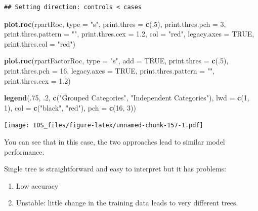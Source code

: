 \documentclass[12pt,]{krantz}
\makeatletter
\newenvironment{Shaded}{\begin{snugshade}}{\end{snugshade}}
\newcommand{\DataTypeTok}[1]{\textcolor[rgb]{0.27,0.27,0.27}{#1}}
\newcommand{\DecValTok}[1]{\textcolor[rgb]{0.06,0.06,0.06}{#1}}
\newcommand{\FloatTok}[1]{\textcolor[rgb]{0.06,0.06,0.06}{#1}}
\newcommand{\KeywordTok}[1]{\textcolor[rgb]{0.27,0.27,0.27}{\textbf{#1}}}
\newcommand{\NormalTok}[1]{#1}
\newcommand{\OtherTok}[1]{\textcolor[rgb]{0.37,0.37,0.37}{#1}}
\newcommand{\StringTok}[1]{\textcolor[rgb]{0.5,0.5,0.5}{#1}}
\providecommand{\tightlist}{%
  \setlength{\itemsep}{0pt}\setlength{\parskip}{0pt}}
\newenvironment{kframe}{%
\medskip{}
\setlength{\fboxsep}{.8em}
 \def\at@end@of@kframe{}%
 \ifinner\ifhmode%
  \def\at@end@of@kframe{\end{minipage}}%
  \begin{minipage}{\columnwidth}%
 \fi\fi%
 \def\FrameCommand##1{\hskip\@totalleftmargin \hskip-\fboxsep
 \colorbox{shadecolor}{##1}\hskip-\fboxsep
     \hskip-\linewidth \hskip-\@totalleftmargin \hskip\columnwidth}%
 \MakeFramed {\advance\hsize-\width
   \@totalleftmargin\z@ \linewidth\hsize
   \@setminipage}}%
 {\par\unskip\endMakeFramed%
 \at@end@of@kframe}
\renewenvironment{Shaded}{\begin{kframe}}{\end{kframe}}
\makeatother
\begin{document}
\begin{verbatim}
## Setting direction: controls < cases
\end{verbatim}

\begin{Shaded}
\begin{Highlighting}[]
\KeywordTok{plot.roc}\NormalTok{(rpartRoc, }
     \DataTypeTok{type =} \StringTok{"s"}\NormalTok{, }
     \DataTypeTok{print.thres =} \KeywordTok{c}\NormalTok{(.}\DecValTok{5}\NormalTok{),}
     \DataTypeTok{print.thres.pch =} \DecValTok{3}\NormalTok{,}
     \DataTypeTok{print.thres.pattern =} \StringTok{""}\NormalTok{,}
     \DataTypeTok{print.thres.cex =} \FloatTok{1.2}\NormalTok{,}
     \DataTypeTok{col =} \StringTok{"red"}\NormalTok{, }\DataTypeTok{legacy.axes =} \OtherTok{TRUE}\NormalTok{,}
     \DataTypeTok{print.thres.col =} \StringTok{"red"}\NormalTok{)}

\KeywordTok{plot.roc}\NormalTok{(rpartFactorRoc,}
     \DataTypeTok{type =} \StringTok{"s"}\NormalTok{,}
     \DataTypeTok{add =} \OtherTok{TRUE}\NormalTok{,}
     \DataTypeTok{print.thres =} \KeywordTok{c}\NormalTok{(.}\DecValTok{5}\NormalTok{),}
     \DataTypeTok{print.thres.pch =} \DecValTok{16}\NormalTok{, }\DataTypeTok{legacy.axes =} \OtherTok{TRUE}\NormalTok{,}
     \DataTypeTok{print.thres.pattern =} \StringTok{""}\NormalTok{,}
     \DataTypeTok{print.thres.cex =} \FloatTok{1.2}\NormalTok{)}

\KeywordTok{legend}\NormalTok{(.}\DecValTok{75}\NormalTok{, }\FloatTok{.2}\NormalTok{,}
       \KeywordTok{c}\NormalTok{(}\StringTok{"Grouped Categories"}\NormalTok{, }\StringTok{"Independent Categories"}\NormalTok{),}
       \DataTypeTok{lwd =} \KeywordTok{c}\NormalTok{(}\DecValTok{1}\NormalTok{, }\DecValTok{1}\NormalTok{),}
       \DataTypeTok{col =} \KeywordTok{c}\NormalTok{(}\StringTok{"black"}\NormalTok{, }\StringTok{"red"}\NormalTok{),}
       \DataTypeTok{pch =} \KeywordTok{c}\NormalTok{(}\DecValTok{16}\NormalTok{, }\DecValTok{3}\NormalTok{))}
\end{Highlighting}
\end{Shaded}

\texttt{[image: IDS\_files/figure-latex/unnamed-chunk-157-1.pdf]}

You can see that in this case, the two approaches lead to similar model performance.

Single tree is straightforward and easy to interpret but it has problems:

\begin{enumerate}
\def\labelenumi{\arabic{enumi}.}
\tightlist
\item
  Low accuracy
\item
  Unstable: little change in the training data leads to very different trees.
\end{enumerate}
\end{document}
